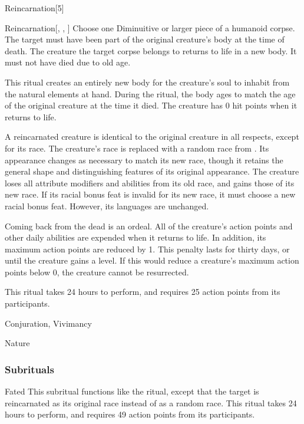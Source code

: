 \begin{spellsection}{Reincarnation}[5]


\begin{ability}{Reincarnation}[, , ]
Choose one Diminuitive or larger piece of a humanoid corpse.
The target must have been part of the original creature's body at the time of death.
The creature the target corpse belongs to returns to life in a new body.
It must not have died due to old age.

This ritual creates an entirely new body for the creature's soul to inhabit from the natural elements at hand.
During the ritual, the body ages to match the age of the original creature at the time it died.
The creature has 0 hit points when it returns to life.

A reincarnated creature is identical to the original creature in all respects, except for its race.
The creature's race is replaced with a random race from .
Its appearance changes as necessary to match its new race, though it retains the general shape and distinguishing features of its original appearance.
The creature loses all attribute modifiers and abilities from its old race, and gains those of its new race.
If its racial bonus feat is invalid for its new race, it must choose a new racial bonus feat.
However, its languages are unchanged.

Coming back from the dead is an ordeal.
All of the creature's action points and other daily abilities are expended when it returns to life.
In addition, its maximum action points are reduced by 1.
This penalty lasts for thirty days, or until the creature gains a level.
If this would reduce a creature's maximum action points below 0, the creature cannot be resurrected.

This ritual takes 24 hours to perform, and requires 25 action points from its participants.
\end{ability}




 Conjuration, Vivimancy

 Nature
\end{spellsection}


\subsubsection{Subrituals}


\begin{ability}[\nth{7}]{Fated}
This subritual functions like the  ritual, except that the target is reincarnated as its original race instead of as a random race.
This ritual takes 24 hours to perform, and requires 49 action points from its participants.
\end{ability}
\vspace{0.25em}


